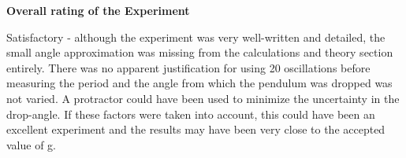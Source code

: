 \textbf{Overall rating of the Experiment}

Satisfactory - although the experiment was very well-written and detailed, the small angle approximation was missing from the calculations and theory section entirely. There was no apparent justification for using 20 oscillations before measuring the period and the angle from which the pendulum was dropped was not varied. A protractor could have been used to minimize the uncertainty in the drop-angle. If these factors were taken into account, this could have been an excellent experiment and the results may have been very close to the accepted value of g.
